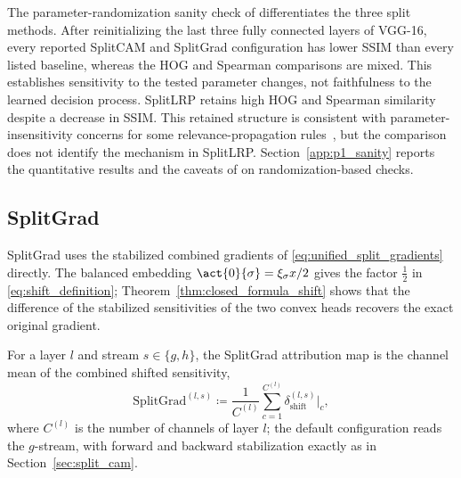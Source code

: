 \begin{remark}\label{rem:splitlrp_sanity}
The parameter-randomization sanity check of \textcite{Adebayo2018sanity} differentiates the three split methods. After reinitializing the last three fully connected layers of VGG-16, every reported SplitCAM and SplitGrad configuration has lower SSIM than every listed baseline, whereas the HOG and Spearman comparisons are mixed. This establishes sensitivity to the tested parameter changes, not faithfulness to the learned decision process. SplitLRP retains high HOG and Spearman similarity despite a decrease in SSIM. This retained structure is consistent with parameter-insensitivity concerns for some relevance-propagation rules~\parencite{sixt2020whenexplanationslie}, but the comparison does not identify the mechanism in SplitLRP. Section~\ref{app:p1_sanity} reports the quantitative results and the caveats of \textcite{Binder2022shortcomings} on randomization-based checks.
\end{remark}

\subsection{SplitGrad}\label{sec:split_grad}

SplitGrad uses the stabilized combined gradients of \eqref{eq:unified_split_gradients} directly. The balanced embedding $\act{0}{\sigma}=\xi_\sigma x/2$ gives the factor $\tfrac12$ in \eqref{eq:shift_definition}; Theorem~\ref{thm:closed_formula_shift} shows that the difference of the stabilized sensitivities of the two convex heads recovers the exact original gradient.

\begin{definition}[SplitGrad]\label{def:splitgrad}
For a layer $l$ and stream $s \in \{g, h\}$, the SplitGrad attribution map is the channel mean of the combined shifted sensitivity,
\begin{equation}
	\text{SplitGrad}^{(l, s)} \coloneqq \frac{1}{C^{(l)}} \sum_{c = 1}^{C^{(l)}} \delta_{\mathrm{shift}}^{(l, s)}\big\vert_c,
	\label{eq:splitgrad}
\end{equation}
where $C^{(l)}$ is the number of channels of layer $l$; the default configuration reads the $g$-stream, with forward and backward stabilization exactly as in Section~\ref{sec:split_cam}.
\end{definition}

